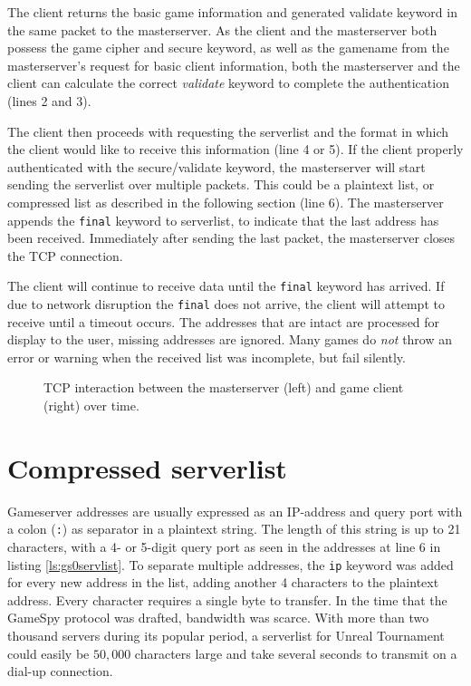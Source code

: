 The client returns the basic game information and generated validate keyword in the same packet to the masterserver. As the client and the masterserver both possess the game cipher and secure keyword, as well as the gamename from the masterserver's request for basic client information, both the masterserver and the client can calculate the correct \emph{validate} keyword to complete the authentication (lines 2 and 3).

The client then proceeds with requesting the serverlist and the format in which the client would like to receive this information (line 4 or 5). If the client properly authenticated with the secure/validate keyword, the masterserver will start sending the serverlist over multiple packets. This could be a plaintext list, or compressed list as described in the following section (line 6). The masterserver appends the {\tt final} keyword to serverlist, to indicate that the last address has been received. Immediately after sending the last packet, the masterserver closes the TCP connection.

The client will continue to receive data until the {\tt final} keyword has arrived. If due to network disruption the {\tt final} does not arrive, the client will attempt to receive until a timeout occurs. The addresses that are intact are processed for display to the user, missing addresses are ignored. Many games do \emph{not} throw an error or warning when the received list was incomplete, but fail silently. 

\begin{figure}[H]
\centering

\caption{TCP interaction between the masterserver (left) and game client (right) over time.}
\label{fig:client}
\end{figure}

\section{Compressed serverlist}
Gameserver addresses are usually expressed as an IP-address and query port with a colon ({\tt :}) as separator in a plaintext string. The length of this string is up to 21 characters, with a 4- or 5-digit query port as seen in the addresses at line 6 in listing \ref{ls:gs0servlist}. To separate multiple addresses, the {\tt ip} keyword was added for every new address in the list, adding another 4 characters to the plaintext address. Every character requires a single byte to transfer. In the time that the GameSpy protocol was drafted, bandwidth was scarce. With more than two thousand servers during its popular period, a serverlist for Unreal Tournament could easily be $50,000$ characters large and take several seconds to transmit on a dial-up connection.


